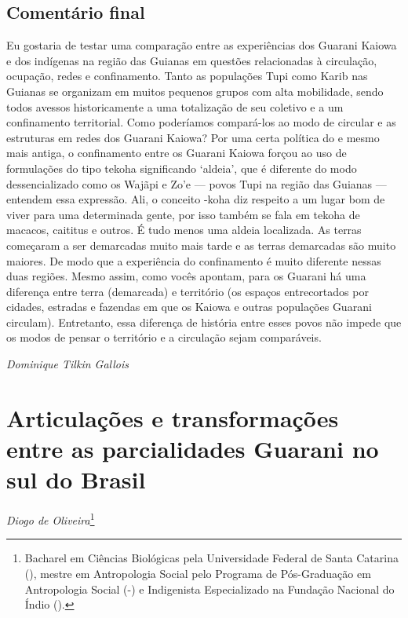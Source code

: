 \section{Comentário final}
Eu gostaria de testar uma comparação entre as experiências dos Guarani
Kaiowa e dos indígenas na região das Guianas em questões relacionadas à
circulação, ocupação, redes e confinamento. Tanto as populações Tupi
como Karib nas Guianas se organizam em muitos pequenos grupos com alta
mobilidade, sendo todos avessos historicamente a uma totalização de seu
coletivo e a um confinamento territorial. Como poderíamos compará-los
ao modo de circular e as estruturas em redes dos Guarani Kaiowa? Por
uma certa política do  e mesmo mais antiga, o confinamento entre os
Guarani Kaiowa forçou ao uso de formulações do tipo tekoha significando
‘aldeia’, que é diferente do modo dessencializado como os Wajãpi e Zo’e
--- povos Tupi na região das Guianas --- entendem essa expressão. Ali, o
conceito -koha diz respeito a um lugar bom de viver para uma
determinada gente, por isso também se fala em tekoha de macacos,
caititus e outros. É tudo menos uma aldeia localizada. As terras
começaram a ser demarcadas muito mais tarde e as terras demarcadas são
muito maiores. De modo que a experiência do confinamento é muito
diferente nessas duas regiões. Mesmo assim, como vocês apontam, para os
Guarani há uma diferença entre terra (demarcada) e território (os
espaços entrecortados por cidades, estradas e fazendas em que os Kaiowa
e outras populações Guarani circulam). Entretanto, essa diferença de
história entre esses povos não impede que os modos de pensar o
território e a circulação sejam comparáveis. 
\medskip
\begin{flushright}
\emph{Dominique Tilkin Gallois}
\end{flushright}

\chapter{Articulações e transformações entre as parcialidades Guarani no sul do
Brasil}
\begin{flushright}
\emph{Diogo de Oliveira}\footnote{Bacharel em Ciências Biológicas pela Universidade Federal de Santa Catarina (),
mestre em Antropologia Social pelo Programa de Pós-Graduação em Antropologia Social (-) e Indigenista
Especializado na Fundação Nacional do Índio ().}
\end{flushright}

